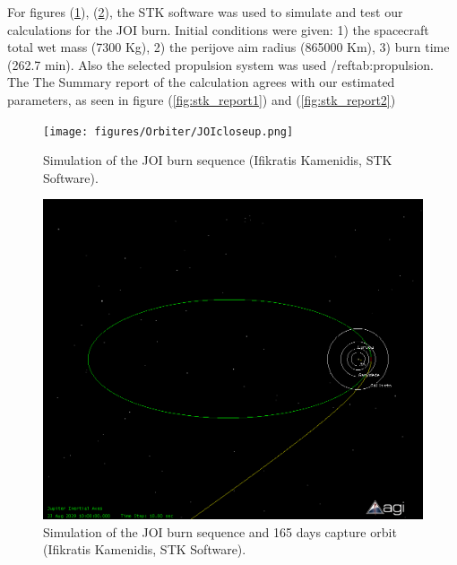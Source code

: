 For figures (\ref{fig:joicloseup}), (\ref{fig:joifull}), the STK software was used to simulate and test our calculations for the JOI burn. Initial conditions were given: 1) the spacecraft total wet mass (7300 Kg), 2) the perijove aim radius (865000 Km), 3) burn time (262.7 min). Also the selected propulsion system was used /ref{tab:propulsion}. The The Summary report of the calculation agrees with our estimated parameters, as seen in figure (\ref{fig:stk_report1}) and (\ref{fig:stk_report2})

\begin{figure}[htb!]
\centering
\texttt{[image: figures/Orbiter/JOIcloseup.png]}
\caption{Simulation of the JOI burn sequence (Ifikratis Kamenidis, STK Software).}
\label{fig:joicloseup}
\end{figure}

\begin{figure}[htb!]
\centering
\includegraphics[scale=0.4]{figures/Orbiter/JOIfull.png}
\caption{Simulation of the JOI burn sequence and 165 days capture orbit (Ifikratis Kamenidis, STK Software).}
\label{fig:joifull}
\end{figure}

